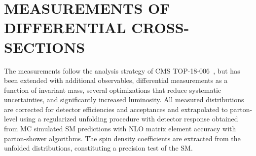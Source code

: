 
\chapter{MEASUREMENTS OF DIFFERENTIAL CROSS-SECTIONS}
\label{Measurements_of_Differential_Cross-sections}
The measurements follow the analysis strategy of CMS TOP-18-006~\cite{Sirunyan:2681777}, but has been extended with additional observables, differential measurements as a function of \ttbar invariant mass, several optimizations that reduce systematic uncertainties, and significantly increased luminosity.
All measured distributions are corrected for detector efficiencies and acceptances and extrapolated to parton-level using a regularized unfolding procedure with detector response obtained from MC simulated SM predictions with NLO matrix element accuracy with parton-shower algorithms.
The spin density coefficients are extracted from the unfolded distributions, constituting a precision test of the SM.

